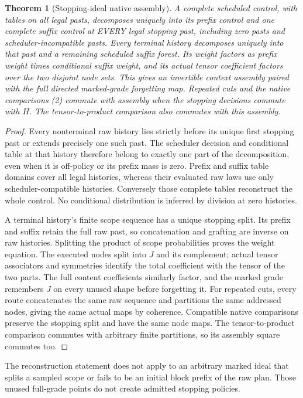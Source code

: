\documentclass[11pt]{article}
\newtheorem{theorem}{Theorem}\newtheorem{proposition}[theorem]{Proposition}
\begin{document}
\begin{theorem}[Stopping-ideal native assembly]
A complete scheduled control, with tables on all legal pasts, decomposes uniquely into its prefix control and one complete suffix control at EVERY legal stopping past, including zero pasts and scheduler-incompatible pasts. Every terminal history decomposes uniquely into that past and a remaining scheduled suffix forest. Its weight factors as prefix weight times conditional suffix weight, and its actual tensor coefficient factors over the two disjoint node sets. This gives an invertible context assembly paired with the full directed marked-grade forgetting map. Repeated cuts and the native comparisons (2) commute with assembly when the stopping decisions commute with $H$. The tensor-to-product comparison also commutes with this assembly.
\end{theorem}
\begin{proof}
Every nonterminal raw history lies strictly before its unique first stopping past or extends precisely one such past. The scheduler decision and conditional table at that history therefore belong to exactly one part of the decomposition, even when it is off-policy or its prefix mass is zero. Prefix and suffix table domains cover all legal histories, whereas their evaluated raw laws use only scheduler-compatible histories. Conversely those complete tables reconstruct the whole control. No conditional distribution is inferred by division at zero histories.

A terminal history's finite scope sequence has a unique stopping split. Its prefix and suffix retain the full raw past, so concatenation and grafting are inverse on raw histories. Splitting the product of scope probabilities proves the weight equation. The executed nodes split into $J$ and its complement; actual tensor associators and symmetries identify the total coefficient with the tensor of the two parts. The full content coefficients similarly factor, and the marked grade remembers $J$ on every unused shape before forgetting it. For repeated cuts, every route concatenates the same raw sequence and partitions the same addressed nodes, giving the same actual maps by coherence. Compatible native comparisons preserve the stopping split and have the same node maps. The tensor-to-product comparison commutes with arbitrary finite partitions, so its assembly square commutes too.
\end{proof}

The reconstruction statement does not apply to an arbitrary marked ideal that splits a sampled scope or fails to be an initial block prefix of the raw plan. Those unused full-grade points do not create admitted stopping policies.
\end{document}
